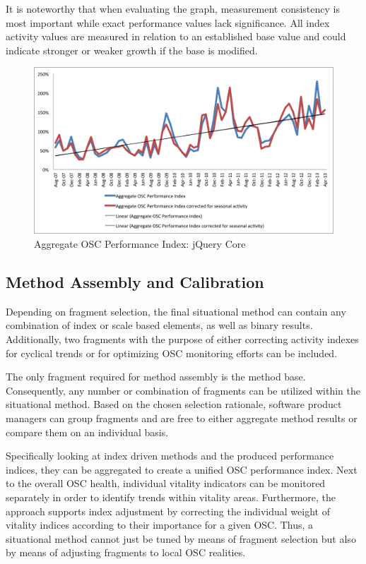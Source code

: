 \documentclass[final,5p,times,twocolumn]{elsarticle}
\begin{document}
It is noteworthy that when evaluating the graph, measurement consistency is most important while exact performance values lack significance. All index activity values are measured in relation to an established base value and could indicate stronger or weaker growth if the base is modified.
\begin{figure}
\begin{center}
\includegraphics[scale=0.7]{figures/Aggregate_OSC_Performance_Index.png}
\caption{Aggregate OSC Performance Index: jQuery Core}
\label{fig:OSC_performance_index}
\end{center}
\end{figure}   
\subsection{Method Assembly and Calibration}
Depending on fragment selection, the final situational method can contain any combination of index or scale based elements, as well as binary results. Additionally, two fragments with the purpose of either correcting activity indexes for cyclical trends or for optimizing OSC monitoring efforts can be included. 

The only fragment required for method assembly is the method base. Consequently, any number or combination of fragments can be utilized within the situational method. Based on the chosen selection rationale, software product managers can group fragments and are free to either aggregate method results or compare them on an individual basis. 

Specifically looking at index driven methods and the produced performance indices, they can be aggregated to create a unified OSC performance index. Next to the overall OSC health, individual vitality indicators can be monitored separately in order to identify trends within vitality areas. Furthermore, the approach supports index adjustment by correcting the individual weight of vitality indices according to their importance for a given OSC. Thus, a situational method cannot just be tuned by means of fragment selection but also by means of adjusting fragments to local OSC realities. 
\end{document}
